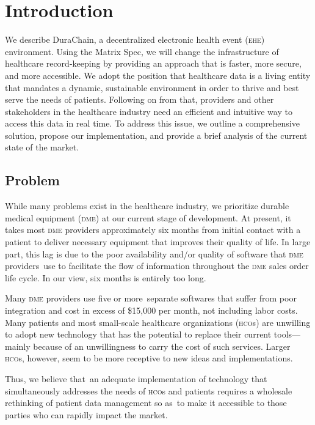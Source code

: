 
\section{Introduction}
We describe DuraChain, a decentralized electronic health event (\textsc{ehe}) environment. Using the Matrix Spec,\cite{matrixspec}
we will change the infrastructure of healthcare record-keeping by providing an approach that is faster, more secure, and more accessible. We adopt the position that healthcare data is a living entity that mandates a dynamic, sustainable environment in order to thrive and best serve the needs of patients. Following on from that, providers and other stakeholders in the healthcare industry need an efficient and intuitive way to access this data in real time. To address this issue, we outline a comprehensive solution, propose our implementation, and provide a brief analysis of the current state of the market.%

\subsection{Problem}
While many problems exist in the healthcare industry, we prioritize durable medical equipment (\textsc{dme}) at our current stage of development. At present, it takes most \textsc{dme} providers approximately six months from initial contact with a patient to deliver necessary equipment that improves their quality of life. In large part, this lag is due to the poor availability and/or quality of software that \textsc{dme} providers use to facilitate the flow of information throughout the \textsc{dme} sales order life cycle. In our view, six months is entirely too long.%

Many \textsc{dme} providers use five or more separate softwares that suffer from poor integration and cost in excess of \$15,000 per month, not including labor costs. Many patients and most small-scale healthcare organizations (\textsc{hco}s) are unwilling to adopt new technology that has the potential to replace their current tools---mainly because of an unwillingness to carry the cost of such services. Larger \textsc{hco}s, however, seem to be more receptive to new ideas and implementations.﻿%

Thus, we believe that an adequate implementation of technology that simultaneously addresses the needs of \textsc{hco}s and patients requires a wholesale rethinking of patient data management so as to make it accessible to those parties who can rapidly impact the market.%

